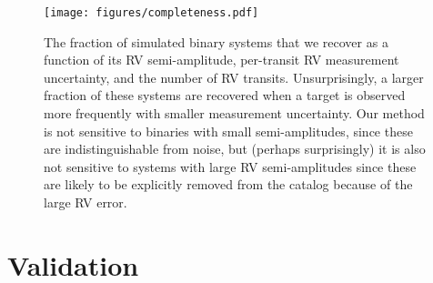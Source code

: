 \documentclass[modern, letterpaper]{aastex631}
\newcommand{\project}[1]{\textsl{#1}}
\newcommand{\Gaia}{\project{Gaia}}
\begin{document}

\begin{figure}
	\begin{centering}
		\texttt{[image: figures/completeness.pdf]}
		\caption{The fraction of simulated binary systems that we recover as a function of its RV semi-amplitude, per-transit RV measurement uncertainty, and the number of RV transits. Unsurprisingly, a larger fraction of these systems are recovered when a target is observed more frequently with smaller measurement uncertainty. Our method is not sensitive to binaries with small semi-amplitudes, since these are indistinguishable from noise, but (perhaps surprisingly) it is also not sensitive to systems with large RV semi-amplitudes since these are likely to be explicitly removed from the catalog because of the large RV error.}
		\label{fig:completeness}
	\end{centering}
\end{figure}

\section{Validation}
\end{document}
